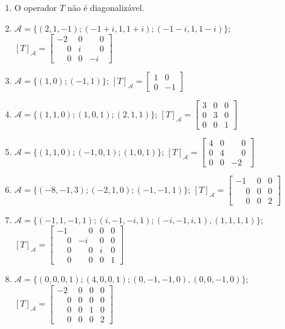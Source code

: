 \documentclass[12pt]{exam}
\begin{document}
\begin{exercicio}
\begin{solucao}
\begin{enumerate}[label=({\alph*})]
          \item O operador $T$ não é diagonalizável.
          \item $\mathcal{A} = \{(2,1,-1);(-1 + i, 1, 1 + i);(-1 - i, 1, 1 - i)\}$; $[T]_\mathcal{A} = \begin{bmatrix} -2 & 0 & \phantom{-} 0\\ \phantom{-} 0 & i & \phantom{-} 0\\ \phantom{-} 0 & 0 & -i\end{bmatrix}$
          \item $\mathcal{A} = \{(1,0);(-1,1)\}$; $[T]_\mathcal{A} = \begin{bmatrix} 1 & 0\\ 0 & -1\end{bmatrix}$
          \item $\mathcal{A} = \{(1,1,0);(1,0,1);(2,1,1)\}$; $[T]_\mathcal{A} = \begin{bmatrix} 3 & 0 & 0\\ 0 & 3 & 0\\ 0 & 0 & 1\end{bmatrix}$
          \item $\mathcal{A} = \{(1,1,0);(-1,0,1);(1,0,1)\}$; $[T]_\mathcal{A} = \begin{bmatrix} 4 & 0 & \phantom{-} 0\\ 0 & 4 & \phantom{-} 0\\ 0 & 0 & -2\end{bmatrix}$
          \item $\mathcal{A} = \{(-8,-1,3);(-2,1,0);(-1,-1,1)\}$; $[T]_\mathcal{A} = \begin{bmatrix} -1 & 0 & 0\\ \phantom{-} 0 & 0 & 0\\ \phantom{-} 0 & 0 & 2\end{bmatrix}$
          \item $\mathcal{A} = \{(-1,1,-1,1); (i,-1,-i,1); (-i,-1,i,1), (1,1,1,1)\}$; $[T]_\mathcal{A} = \begin{bmatrix} -1 & \phantom{-}0 & 0 & 0\\ \phantom{-} 0 & -i & 0 & 0\\ \phantom{-} 0 & \phantom{-}0 & i & 0\\ \phantom{-}0 & \phantom{-}0 & 0 & 1\end{bmatrix}$
          \item $\mathcal{A} = \{(0,0,0,1); (4,0,0,1); (0,-1,-1,0), (0,0,-1,0)\}$; $[T]_\mathcal{A} = \begin{bmatrix} -2 & 0 & 0 & 0\\ \phantom{-} 0 & 0 & 0 & 0\\ \phantom{-} 0 & 0 & 1 & 0\\ \phantom{-}0 & 0 & 0 & 2\end{bmatrix}$
        \end{enumerate}
  \end{solucao}
\end{exercicio}
\end{document}
